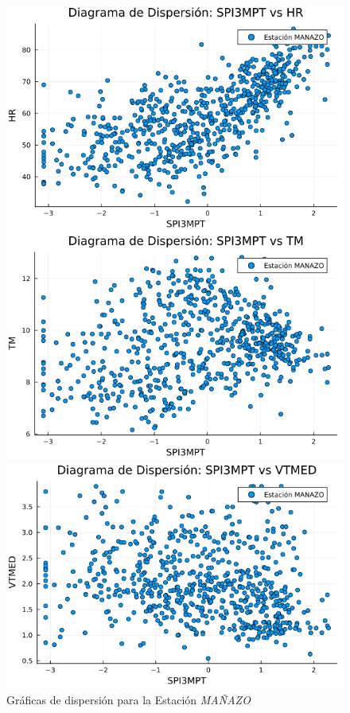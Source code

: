 \begin{figure}[htbp]
\centering
\caption{Gráficas de dispersión para la Estación \textit{MAÑAZO}}
\begin{minipage}{0.32\textwidth}
    \centering
    \includegraphics[width=\linewidth]{Capitulos/Scaterplot/MANAZO_SPI3MPT_vs_HR.png}
\end{minipage}\hfill
\begin{minipage}{0.32\textwidth}
    \centering
    \includegraphics[width=\linewidth]{Capitulos/Scaterplot/MANAZO_SPI3MPT_vs_TM.png}
\end{minipage}\hfill
\begin{minipage}{0.32\textwidth}
    \centering
    \includegraphics[width=\linewidth]{Capitulos/Scaterplot/MANAZO_SPI3MPT_vs_VTMED.png}

\end{minipage}
\end{figure}
